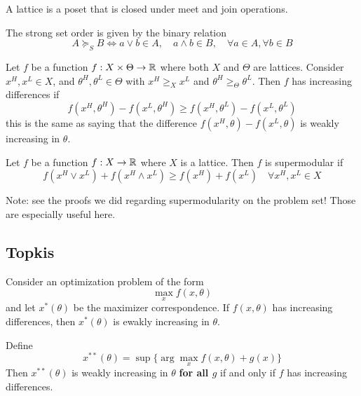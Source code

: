 \begin{definition}[Lattice]
  A lattice is a poset that is closed under meet and join operations.
\end{definition}

\begin{definition}
  The strong set order is given by the binary relation
  \[
  A \succeq_S B \iff
  a \vee b \in A, \quad
  a \wedge b \in B, \quad
  \forall a \in A, \forall b \in B
  \]
\end{definition}

\begin{definition}
  Let $f$ be a function $f : X \times \Theta \to {\mathbb R}$ where both $X$
  and $\Theta$ are lattices. Consider $x^H, x^L \in X$, and $\theta^H,
  \theta^L \in \Theta$ with $x^H \geq_X x^L$ and $\theta^H \geq_\Theta
  \theta^L$. Then $f$ has increasing differences if
  \[
  f(x^H, \theta^H) - f(x^L, \theta^H) \geq
  f(x^H, \theta^L) - f(x^L, \theta^L)
  \]
  this is the same as saying that the difference $f(x^H, \theta) -
  f(x^L, \theta)$ is weakly increasing in $\theta$.
\end{definition}

\begin{definition}[Supermodularity]
  Let $f$ be a function $f : X \to {\mathbb R}$ where $X$ is a lattice. Then
  $f$ is supermodular if
  \[
  f(x^H \vee x^L) + f(x^H \wedge x^L) \geq f(x^H) + f(x^L) \quad
  \forall x^H, x^L \in X
  \]
\end{definition}

Note: see the proofs we did regarding supermodularity on the problem
set! Those are especially useful here.

\subsection{Topkis}
\label{sec:topkis}

\begin{theorem}
  Consider an optimization problem of the form
  \[
  \max_{x} f(x, \theta)
  \]
  and let $x^*(\theta)$ be the maximizer correspondence. If $f(x,
  \theta)$ has increasing differences, then $x^*(\theta)$ is ewakly
  increasing in $\theta$.
\end{theorem}

\begin{prop}
  Define
  \[
  x^{**}(\theta) = \sup\{ \arg \max_x f(x,\theta) + g(x) \}
  \]
  Then $x^{**}(\theta)$ is weakly increasing in $\theta$ \textbf{for
    all $g$} if and only if $f$ has increasing differences.
\end{prop}

